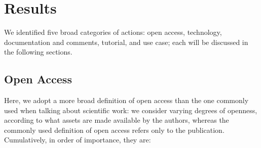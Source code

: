 \documentclass[12pt]{article}
\begin{document}
\section{Results}
\label{sec:orga5f247b}
We identified five broad categories of actions: open access, technology, documentation and comments, tutorial, and use case; each will be discussed in the following sections.

\subsection{Open Access}
\label{sec:orgcf240e3}
Here, we adopt a more broad definition of open access than the one commonly used when talking about scientific work: we consider varying degrees of openness, according to what assets are made available by the authors, whereas the commonly used definition of open access refers only to the publication. Cumulatively, in order of importance, they are:
\end{document}
